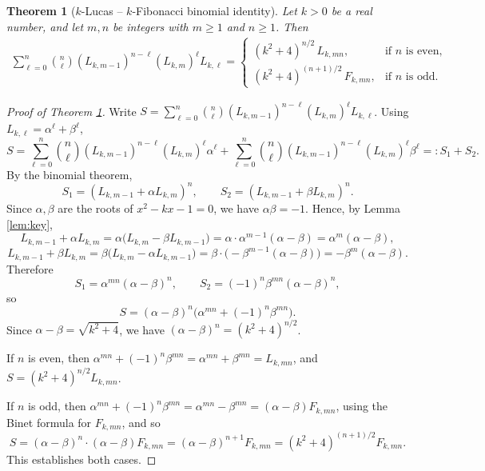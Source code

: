 \documentclass[10pt,a4paper]{amsart}
\newtheorem{theorem}{Theorem}
\begin{document}
\begin{theorem}[$k$-Lucas -- $k$-Fibonacci binomial identity]
	\label{thm:main}
	Let $k>0$ be a real number, and let $m,n$ be integers with $m\ge 1$ and $n\ge1$. Then
 \begin{align*}
	\sum_{\ell=0}^{n}\binom{n}{\ell}(L_{k,m-1})^{n-\ell}(L_{k,m})^{\ell}L_{k,\ell}
	=
	\begin{cases}
		(k^2+4)^{n/2}\,L_{k,mn}, & \text{if } n \text{ is even},\\[6pt]
		(k^2+4)^{(n+1)/2}\,F_{k,mn}, & \text{if } n \text{ is odd}.
	\end{cases}
 \end{align*}
\end{theorem}

	\begin{proof}[Proof of Theorem \ref{thm:main}]
		Write $S=\sum_{\ell=0}^n\binom{n}{\ell}(L_{k,m-1})^{n-\ell}(L_{k,m})^{\ell}L_{k,\ell}$. Using $L_{k,\ell}=\alpha^{\ell}+\beta^{\ell}$,
		\[
		S=\sum_{\ell=0}^n\binom{n}{\ell}(L_{k,m-1})^{n-\ell}(L_{k,m})^{\ell}\alpha^{\ell}
		+\sum_{\ell=0}^n\binom{n}{\ell}(L_{k,m-1})^{n-\ell}(L_{k,m})^{\ell}\beta^{\ell}
		=:S_1+S_2.
		\]
		By the binomial theorem,
		\[
		S_1=(L_{k,m-1}+\alpha L_{k,m})^n,\qquad S_2=(L_{k,m-1}+\beta L_{k,m})^n.
		\]
		Since $\alpha,\beta$ are the roots of $x^2-kx-1=0$, we have $\alpha\beta=-1$. Hence, by Lemma \ref{lem:key},
		\[
		L_{k,m-1}+\alpha L_{k,m}=\alpha\bigl(L_{k,m}-\beta L_{k,m-1}\bigr)=\alpha\cdot\alpha^{m-1}(\alpha-\beta)=\alpha^{m}(\alpha-\beta),
		\]
		\[
		L_{k,m-1}+\beta L_{k,m}=\beta\bigl(L_{k,m}-\alpha L_{k,m-1}\bigr)=\beta\cdot\bigl(-\beta^{m-1}(\alpha-\beta)\bigr)=-\beta^{m}(\alpha-\beta).
		\]
		Therefore
		\[
		S_1=\alpha^{mn}(\alpha-\beta)^n,\qquad S_2=(-1)^n\beta^{mn}(\alpha-\beta)^n,
		\]
		so
		\[
		S=(\alpha-\beta)^n\bigl(\alpha^{mn}+(-1)^n\beta^{mn}\bigr).
		\]
		Since $\alpha-\beta=\sqrt{k^2+4}$, we have $(\alpha-\beta)^n=(k^2+4)^{n/2}$.
		
		If $n$ is even, then $\alpha^{mn}+(-1)^n\beta^{mn}=\alpha^{mn}+\beta^{mn}=L_{k,mn}$, and $S=(k^2+4)^{n/2}L_{k,mn}$.
		
		If $n$ is odd, then $\alpha^{mn}+(-1)^n\beta^{mn}=\alpha^{mn}-\beta^{mn}=(\alpha-\beta)F_{k,mn}$, using the Binet formula for $F_{k,mn}$, and so
		\[
		S=(\alpha-\beta)^n\cdot(\alpha-\beta)F_{k,mn}=(\alpha-\beta)^{n+1}F_{k,mn}=(k^2+4)^{(n+1)/2}F_{k,mn}.
		\]
		This establishes both cases.
	\end{proof}
\end{document}
